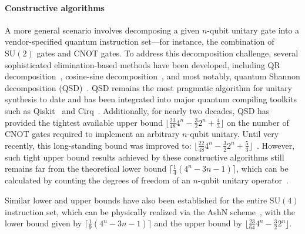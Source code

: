 \documentclass[a4paper,onecolumn,11pt,unpublished]{quantumarticle}
\begin{document}
\paragraph{Constructive algorithms}
A more general scenario involves decomposing a given $n$-qubit unitary gate into a vendor-specified quantum instruction set---for instance, the combination of $\mathrm{SU}(2)$ gates and CNOT gates. To address this decomposition challenge, several sophisticated elimination-based methods have been developed, including QR decomposition~\cite{Cybenko2001Reducing}, cosine-sine decomposition~\cite{Mottonen2004Quantum}, and most notably, quantum Shannon decomposition (QSD)~\cite{Shende2006Synthesis}. QSD remains the most pragmatic algorithm for unitary synthesis to date and has been integrated into major quantum compiling toolkits such as Qiskit~\cite{Wille2019IBMs} and Cirq~\cite{Developers2024Cirq}. Additionally, for nearly two decades, QSD has provided the tightest available upper bound $\lfloor \frac{23}{48}4^n - \frac{3}{2}2^n + \frac{4}{3} \rfloor$ on the number of CNOT gates required to implement an arbitrary $n$-qubit unitary. Until very recently, this long-standing bound was improved to: $\lfloor \frac{22}{48}4^n - \frac{3}{2}2^n + \frac{5}{3}\rfloor$~\cite{krol2024beyond}. However, such tight upper bound results achieved by these constructive algorithms still remains far from the theoretical lower bound $\lceil \frac{1}{4}(4^n - 3n - 1) \rceil$, which can be calculated by counting the degrees of freedom of an $n$-qubit unitary operator~\cite{Shende2004Minimal}. 

Similar lower and upper bounds have also been established for the entire $\mathrm{SU}(4)$ instruction set, which can be physically realized via the AshN scheme~\cite{Chen2024One}, with the lower bound given by $\lceil \frac{1}{9}(4^n - 3n - 1) \rceil$ and the upper bound by $\lfloor \frac{23}{64}4^n - \frac{3}{2}2^n\rfloor$.
\end{document}
